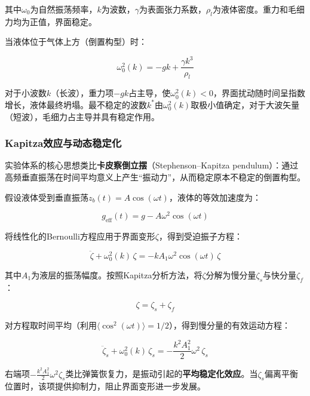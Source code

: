 \documentclass[12pt,a4paper]{ctexart}
\begin{document}
其中$\omega_0$为自然振荡频率，$k$为波数，$\gamma$为表面张力系数，$\rho_l$为液体密度。重力和毛细力均为正值，界面稳定。

当液体位于气体上方（倒置构型）时：

\begin{equation}
\omega_0^2(k) = -gk + \frac{\gamma k^3}{\rho_l}
\end{equation}

对于小波数$k$（长波），重力项$-gk$占主导，使$\omega_0^2(k)<0$，界面扰动随时间呈指数增长，液体最终坍塌。最不稳定的波数$k^*$由$\omega_0^2(k)$取极小值确定，对于大波矢量（短波），毛细力占主导并具有稳定作用。

\subsubsection{Kapitza效应与动态稳定化}

实验体系的核心思想类比\textbf{卡皮察倒立摆}（Stephenson--Kapitza pendulum）：通过高频垂直振荡在时间平均意义上产生``振动力''，从而稳定原本不稳定的倒置构型。

假设液体受到垂直振荡$z_b(t) = A\cos(\omega t)$，液体的等效加速度为：

\begin{equation}
g_{\mathrm{eff}}(t) = g - A\omega^2\cos(\omega t)
\end{equation}

将线性化的Bernoulli方程应用于界面变形$\zeta$，得到受迫振子方程：

\begin{equation}
\ddot{\zeta} + \omega_0^2(k)\,\zeta = -kA_1\omega^2\cos(\omega t)\,\zeta
\end{equation}

其中$A_1$为液层的振荡幅度。按照Kapitza分析方法，将$\zeta$分解为慢分量$\zeta_s$与快分量$\zeta_f$：

\begin{equation}
\zeta = \zeta_s + \zeta_f
\end{equation}

对方程取时间平均（利用$\langle\cos^2(\omega t)\rangle = 1/2$），得到慢分量的有效运动方程：

\begin{equation}
\ddot{\zeta}_s + \omega_0^2(k)\,\zeta_s = -\frac{k^2A_1^2}{2}\omega^2\,\zeta_s
\end{equation}

右端项$-\frac{k^2A_1^2}{2}\omega^2\zeta_s$类比弹簧恢复力，是振动引起的\textbf{平均稳定化效应}。当$\zeta_s$偏离平衡位置时，该项提供抑制力，阻止界面变形进一步发展。
\end{document}
